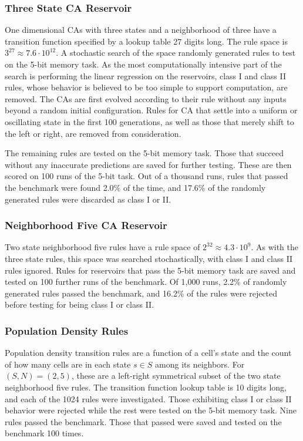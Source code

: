 \documentclass{elsarticle}
\begin{document}
\begin{multicols}{2}
	\subsubsection{Three State CA Reservoir}
	One dimensional CAs with three states and a neighborhood of three have a 
	transition function specified by a lookup table 27 digits long. The rule space 
	is $3^{27} \approx 7.6 \cdot 10^{12}$. A stochastic search of the space 
	randomly generated rules to test on the 5-bit memory task. As the most 
	computationally intensive part of the search is performing the linear 
	regression on the reservoirs, class I and class II rules, whose behavior is 
	believed to be too simple to support computation, are removed. The CAs are 
	first evolved according to their rule without any inputs beyond a random 
	initial configuration. Rules for CA that settle into a uniform or oscillating 
	state in the first 100 generations, as well as those that merely shift to the 
	left or right, are removed from consideration.\par
	The remaining rules are tested on the 5-bit memory task.  Those that succeed 
	without any inaccurate predictions are saved for further testing.  These are 
	then scored on 100 runs of the 5-bit task.  Out of a thousand runs, rules that 
	passed the benchmark were found 2.0\% of the time, and 17.6\% of the randomly 
	generated rules were discarded as class I or II.
	
	\subsubsection{Neighborhood Five CA Reservoir}
	Two state neighborhood five rules have a rule space of $2^{32} \approx 4.3 \cdot 
	10^9$. As with the three state rules, this space was searched 
	stochastically, with class I and class II rules ignored. Rules for 
	reservoirs that pass the 5-bit memory task are saved and tested on 100 
	further runs of the benchmark. Of 1,000 runs, 2.2\% of randomly generated 
	rules passed the benchmark, and 16.2\% of the rules were rejected before 
	testing for being class I or class II.
	\subsubsection{Population Density Rules}
	Population density transition rules are a function of a cell's state and the 
	count of how many cells are in each state $s \in S$ among its neighbors.  
	For $(S,N) = (2,5)$, these are a left-right symmetrical subset of the two 
	state neighborhood five rules. The transition function lookup table is 10 
	digits long, and each of the 1024 rules were investigated. Those exhibiting 
	class I or class II behavior were rejected while the rest were tested on 
	the 5-bit memory task. Nine rules passed the benchmark. Those that passed 
	were saved and tested on the benchmark 100 times.
	

\end{multicols}
\end{document}
